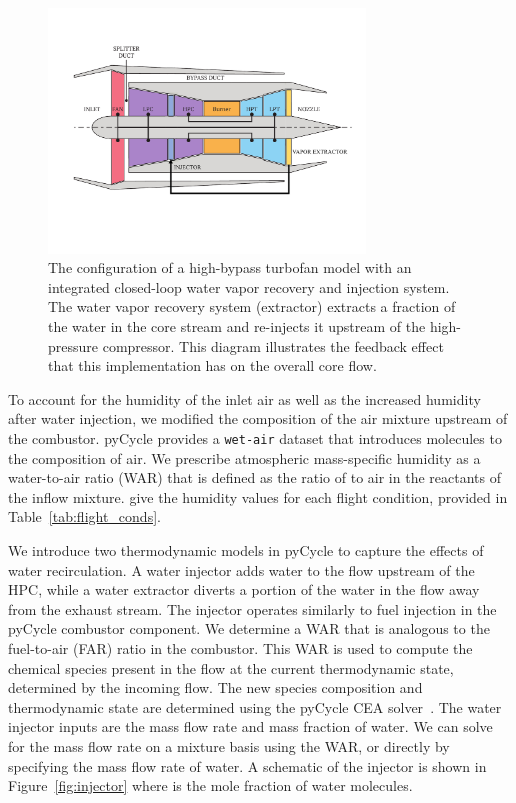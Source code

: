 \documentclass[conf]{new-aiaa}
\begin{document}
\begin{figure}[hbt!]
    \centering
    \includegraphics[width=0.75\textwidth]{turbofan_wvr.pdf}
    \caption{
        The configuration of a high-bypass turbofan model with an integrated closed-loop water vapor recovery and injection system.
        The water vapor recovery system (extractor) extracts a fraction of the water in the core stream and re-injects it upstream of the high-pressure compressor.
        This diagram illustrates the feedback effect that this implementation has on the overall core flow.}
    \label{fig:n3_cycle}
\end{figure}

To account for the humidity of the inlet air as well as the increased humidity after water injection, we modified the composition of the air mixture upstream of the combustor.
pyCycle provides a \texttt{wet-air} dataset that introduces  molecules to the composition of air.
We prescribe atmospheric mass-specific humidity as a water-to-air ratio (WAR) that is defined as the ratio of  to air in the reactants of the inflow mixture.
\citet{Kalnay1996} give the humidity values for each flight condition, provided in Table~\ref{tab:flight_conds}.

We introduce two thermodynamic models in pyCycle to capture the effects of water recirculation.
A water injector adds water to the flow upstream of the HPC, while a water extractor diverts a portion of the water in the flow away from the exhaust stream.
The injector operates similarly to fuel injection in the pyCycle combustor component.
We determine a WAR that is analogous to the fuel-to-air (FAR) ratio in the combustor.
This WAR is used to compute the chemical species present in the flow at the current thermodynamic state, determined by the incoming flow.
The new species composition and thermodynamic state are determined using the pyCycle CEA solver~\cite{Gray2017b}.
The water injector inputs are the mass flow rate and mass fraction of water.
We can solve for the mass flow rate on a mixture basis using the WAR, or directly by specifying the mass flow rate of water.
A schematic of the injector is shown in Figure~\ref{fig:injector} where  is the mole fraction of water molecules.
\end{document}
